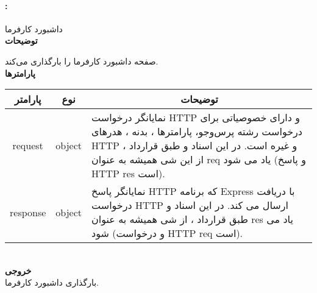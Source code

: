 \paragraph{:}
داشبورد کارفرما
\\
\textbf{توضیحات}
\hr
\begin{flushleft}
	\framebox[.9\textwidth][l]{
		\lr{
			\textcolor{type}{void}
			\textcolor{func}{getRoot}
			\textcolor{symb}{(}
			\textcolor{type}{object}
			\textcolor{arg}{request}
			\textcolor{symb}{,}
			\textcolor{type}{object}
			\textcolor{arg}{response}
			\textcolor{symb}{);}
		}
	}
\end{flushleft}
صفحه داشبورد کارفرما را بارگذاری می‌کند.
\\
\textbf{پارامترها}
\hr \\[10pt]
\begin{tabular}{|m{4cm}|m{3cm}|m{10cm}|}
	\hline
	\multicolumn{1}{|c}{پارامتر}
	&
	\multicolumn{1}{|c}{نوع}
	&
	\multicolumn{1}{|c|}{توضیحات}
	\\
	\hline
	\multicolumn{1}{|c}{request}
	&
	\multicolumn{1}{|c|}{object}
	&
	نمایانگر درخواست HTTP و دارای خصوصیاتی برای درخواست رشته پرس‌و‌جو، پارامترها ، بدنه ، هدرهای HTTP و غیره است.
	در این اسناد و طبق قرارداد ، از این شی همیشه به عنوان req یاد می شود (و پاسخ HTTP res است).
	\\
	\hline
	\multicolumn{1}{|c}{response}
	&
	\multicolumn{1}{|c|}{object}
	&
	نمایانگر پاسخ HTTP که برنامه Express با دریافت درخواست HTTP ارسال می کند.
	در این اسناد و طبق قرارداد ، از شی همیشه به عنوان res یاد می شود (و درخواست HTTP req است).
	\\
	\hline
\end{tabular}
\\[10pt]
\textbf{خروجی}
\hr \\
بارگذاری داشبورد کارفرما.


